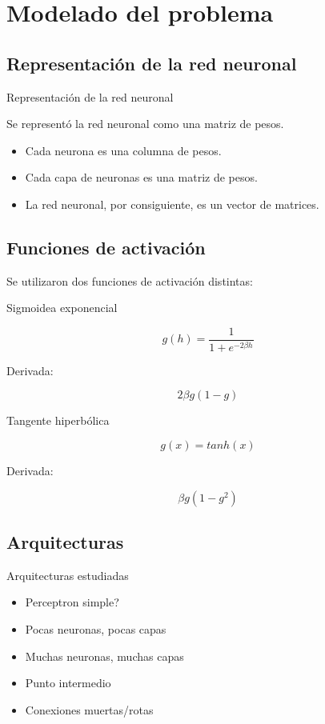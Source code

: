 \documentclass{beamer}
\begin{document}
\section{Modelado del problema}
\subsection{Representación de la red neuronal}

\begin{frame}{Representación de la red neuronal}
\par Se representó la red neuronal como una matriz de pesos. \\
\begin{itemize}
\item Cada neurona es una columna de pesos.
\item Cada capa de neuronas es una matriz de pesos.
\item La red neuronal, por consiguiente, es un vector de matrices.
\end{itemize}
\end{frame}

\subsection{Funciones de activación}
\begin{frame}
 Se utilizaron dos funciones de activación distintas:
\begin{block}{Sigmoidea exponencial}

\[
  g(h) = \frac{1}{1 + e^{-2 \beta h}} 
\]

Derivada:

\[
  2 \beta g(1-g) 
\]

\end{block}

\begin{block}{Tangente hiperbólica}

\[
  g(x) = tanh(x) 
\]

Derivada:

\[
  \beta g(1-g^2) 
\]

\end{block}

\end{frame}


\subsection{Arquitecturas}

\begin{frame}{Arquitecturas estudiadas}
\begin{itemize}
\item Perceptron simple?
\item Pocas neuronas, pocas capas
\item Muchas neuronas, muchas capas
\item Punto intermedio
\item Conexiones muertas/rotas
\end{itemize}
\end{frame}
\end{document}
